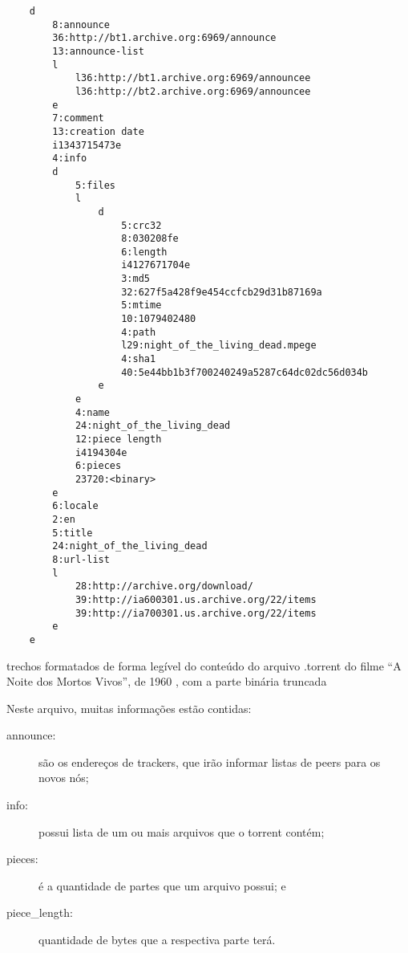 \begin{listing}[H]
    \begin{verbatim}
    d
        8:announce
        36:http://bt1.archive.org:6969/announce
        13:announce-list
        l
            l36:http://bt1.archive.org:6969/announcee
            l36:http://bt2.archive.org:6969/announcee
        e
        7:comment
        13:creation date
        i1343715473e
        4:info
        d
            5:files
            l
                d
                    5:crc32
                    8:030208fe
                    6:length
                    i4127671704e
                    3:md5
                    32:627f5a428f9e454ccfcb29d31b87169a
                    5:mtime
                    10:1079402480
                    4:path
                    l29:night_of_the_living_dead.mpege
                    4:sha1
                    40:5e44bb1b3f700240249a5287c64dc02dc56d034b
                e
            e
            4:name
            24:night_of_the_living_dead
            12:piece length
            i4194304e
            6:pieces
            23720:<binary>
        e
        6:locale
        2:en
        5:title
        24:night_of_the_living_dead
        8:url-list
        l
            28:http://archive.org/download/
            39:http://ia600301.us.archive.org/22/items
            39:http://ia700301.us.archive.org/22/items
        e
    e
    \end{verbatim}
    \caption{trechos formatados de forma legível do conteúdo do arquivo .torrent do
    filme \enquote{A Noite dos Mortos Vivos}, de 1960 \cite{torrent-file}, com a parte
    binária truncada}
    \label{lst:torrent-file-code}
\end{listing}

Neste arquivo, muitas informações estão contidas:

\begin{description}
    \item[announce:] são os endereços de \glspl*{tracker}, que irão informar
        listas de \glspl*{peer} para os novos nós;

    \item[info:] possui lista de um ou mais arquivos que o \gls*{torrent} contém;

    \item[pieces:] é a quantidade de partes que um arquivo possui; e

    \item[piece\_length:] quantidade de bytes que a respectiva parte terá.
\end{description}

